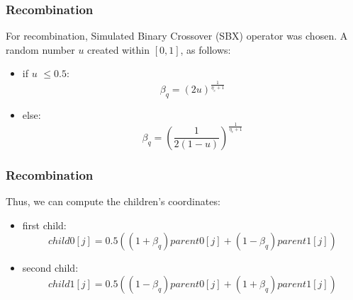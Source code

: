 \documentclass{beamer}
\begin{document}
\begin{frame}
\frametitle{Recombination}
For recombination, Simulated Binary Crossover (SBX) operator was chosen.  
A random number $u$ created within $[0,1]$, as follows:
\begin{itemize}
\item if $u$ $\leq 0.5$:
\begin{equation}
\beta_q = (2u)^{\frac{1}{\eta_c +1}}
\end{equation}
\item else:
\begin{equation}
\beta_q = (\frac{1}{2(1-u)})^{\frac{1}{\eta_c +1}}
\end{equation}
\end{itemize}
\end{frame}

\begin{frame}
\frametitle{Recombination}
Thus, we can compute the children's coordinates:

\begin{itemize}
\item first child:
\begin{equation}
child0[j] = 0.5((1+\beta_q)parent0[j]+(1-\beta_q)parent1[j])
\end{equation}
\item second child:
\begin{equation}
child1[j] = 0.5((1-\beta_q)parent0[j]+(1+\beta_q)parent1[j])
\end{equation}

\end{itemize}

\end{frame}
\end{document}
